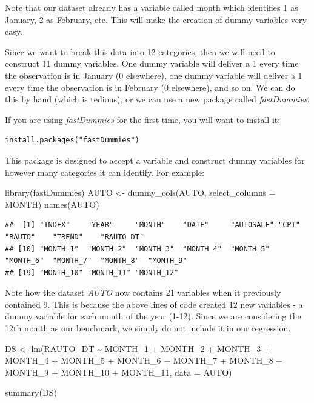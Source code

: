\documentclass[
]{book}
\newenvironment{Shaded}{\begin{snugshade}}{\end{snugshade}}
\newcommand{\AttributeTok}[1]{\textcolor[rgb]{0.77,0.63,0.00}{#1}}
\newcommand{\FunctionTok}[1]{\textcolor[rgb]{0.00,0.00,0.00}{#1}}
\newcommand{\NormalTok}[1]{#1}
\newcommand{\OtherTok}[1]{\textcolor[rgb]{0.56,0.35,0.01}{#1}}
\newcommand{\SpecialCharTok}[1]{\textcolor[rgb]{0.00,0.00,0.00}{#1}}
\newcommand{\StringTok}[1]{\textcolor[rgb]{0.31,0.60,0.02}{#1}}
\begin{document}
Note that our dataset already has a variable called month which identifies 1 as January, 2 as February, etc. This will make the creation of dummy variables very easy.

Since we want to break this data into 12 categories, then we will need to construct 11 dummy variables. One dummy variable will deliver a 1 every time the observation is in January (0 elsewhere), one dummy variable will deliver a 1 every time the observation is in February (0 elsewhere), and so on. We can do this by hand (which is tedious), or we can use a new package called \emph{fastDummies}.

If you are using \emph{fastDummies} for the first time, you will want to install it:

\begin{verbatim}
install.packages("fastDummies")
\end{verbatim}

This package is designed to accept a variable and construct dummy variables for however many categories it can identify. For example:

\begin{Shaded}
\begin{Highlighting}[]
\FunctionTok{library}\NormalTok{(fastDummies)}
\NormalTok{AUTO }\OtherTok{\textless{}{-}} \FunctionTok{dummy\_cols}\NormalTok{(AUTO, }\AttributeTok{select\_columns =} \StringTok{\textquotesingle{}MONTH\textquotesingle{}}\NormalTok{)}
\FunctionTok{names}\NormalTok{(AUTO)}
\end{Highlighting}
\end{Shaded}

\begin{verbatim}
##  [1] "INDEX"    "YEAR"     "MONTH"    "DATE"     "AUTOSALE" "CPI"      "RAUTO"    "TREND"    "RAUTO_DT"
## [10] "MONTH_1"  "MONTH_2"  "MONTH_3"  "MONTH_4"  "MONTH_5"  "MONTH_6"  "MONTH_7"  "MONTH_8"  "MONTH_9" 
## [19] "MONTH_10" "MONTH_11" "MONTH_12"
\end{verbatim}

Note how the dataset \emph{AUTO} now contains 21 variables when it previously contained 9. This is because the above lines of code created 12 new variables - a dummy variable for each month of the year (1-12). Since we are considering the 12th month as our benchmark, we simply do not include it in our regression.

\begin{Shaded}
\begin{Highlighting}[]
\NormalTok{DS }\OtherTok{\textless{}{-}} \FunctionTok{lm}\NormalTok{(RAUTO\_DT }\SpecialCharTok{\textasciitilde{}}\NormalTok{ MONTH\_1 }\SpecialCharTok{+}\NormalTok{ MONTH\_2 }\SpecialCharTok{+}\NormalTok{ MONTH\_3 }\SpecialCharTok{+}\NormalTok{ MONTH\_4 }\SpecialCharTok{+}
\NormalTok{           MONTH\_5 }\SpecialCharTok{+}\NormalTok{ MONTH\_6 }\SpecialCharTok{+}\NormalTok{ MONTH\_7 }\SpecialCharTok{+}\NormalTok{ MONTH\_8 }\SpecialCharTok{+}\NormalTok{ MONTH\_9 }\SpecialCharTok{+}
\NormalTok{           MONTH\_10 }\SpecialCharTok{+}\NormalTok{ MONTH\_11, }\AttributeTok{data =}\NormalTok{ AUTO)}

\FunctionTok{summary}\NormalTok{(DS)}
\end{Highlighting}
\end{Shaded}
\end{document}
